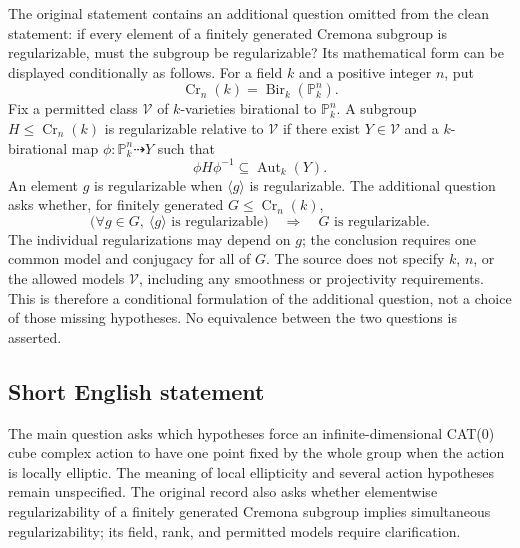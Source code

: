 \documentclass[11pt]{article}
\begin{document}
The original statement contains an additional question omitted from the clean statement: if every element of a finitely generated Cremona subgroup is regularizable, must the subgroup be regularizable? Its mathematical form can be displayed conditionally as follows. For a field \(k\) and a positive integer \(n\), put
\[
\operatorname{Cr}_n(k)=\operatorname{Bir}_k(\mathbb P^n_k).
\]
Fix a permitted class \(\mathcal V\) of \(k\)-varieties birational to \(\mathbb P^n_k\). A subgroup \(H\leq\operatorname{Cr}_n(k)\) is regularizable relative to \(\mathcal V\) if there exist \(Y\in\mathcal V\) and a \(k\)-birational map \(\phi:\mathbb P^n_k\dashrightarrow Y\) such that
\[
\phi H\phi^{-1}\subseteq\operatorname{Aut}_k(Y).
\]
An element \(g\) is regularizable when \(\langle g\rangle\) is regularizable. The additional question asks whether, for finitely generated \(G\leq\operatorname{Cr}_n(k)\),
\[
\bigl(\forall g\in G,\ \langle g\rangle\text{ is regularizable}\bigr)
\quad\Longrightarrow\quad
G\text{ is regularizable}.
\]
The individual regularizations may depend on \(g\); the conclusion requires one common model and conjugacy for all of \(G\). The source does not specify \(k\), \(n\), or the allowed models \(\mathcal V\), including any smoothness or projectivity requirements. This is therefore a conditional formulation of the additional question, not a choice of those missing hypotheses. No equivalence between the two questions is asserted.
\subsection{Short English statement}
The main question asks which hypotheses force an infinite-dimensional CAT(0) cube complex action to have one point fixed by the whole group when the action is locally elliptic. The meaning of local ellipticity and several action hypotheses remain unspecified. The original record also asks whether elementwise regularizability of a finitely generated Cremona subgroup implies simultaneous regularizability; its field, rank, and permitted models require clarification.
\end{document}
